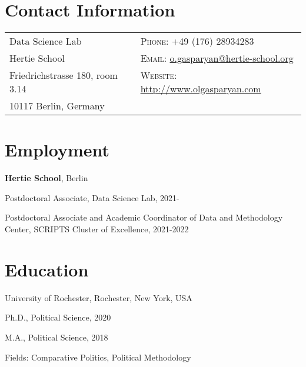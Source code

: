 \documentclass[margin,line,10.95pt]{res}
\newenvironment{list1}{
  \begin{list}{\ding{113}}{%
      \setlength{\itemsep}{0in}
      \setlength{\parsep}{0in} \setlength{\parskip}{0in}
      \setlength{\topsep}{0in} \setlength{\partopsep}{0in}
      \setlength{\leftmargin}{0.17in}}}{\end{list}}
\begin{document}

\begin{resume}
\section{\sc Contact Information}
\vspace{.05in}
\begin{tabular}{@{}p{2.5in}p{4in}}
Data Science Lab                 & \textsc{Phone}: +49 (176) 28934283 \\
  Hertie School  & \textsc{Email}: \href{mailto:o.gasparyan@hertie-school.org}{o.gasparyan@hertie-school.org} \\
Friedrichstrasse 180, room 3.14              & \textsc{Website}: \href{http://www.olgasparyan.com}{http://www.olgasparyan.com} \\
10117 Berlin, Germany        \\
\end{tabular}

\section{\sc Employment}



{\textbf{Hertie School}}, Berlin\\
\vspace*{-.1in}
\begin{list1}
	\item[] Postdoctoral Associate, Data Science Lab, 2021-
	\item[] Postdoctoral Associate and Academic Coordinator of Data and Methodology Center, SCRIPTS Cluster of Excellence, 2021-2022

\end{list1}

\section{\sc Education}
{University of Rochester}, Rochester, New York, USA\\
\vspace*{-.1in}
\begin{list1}
\item[] Ph.D., Political Science, 2020 
\item[] M.A., Political Science, 2018 
\item[] Fields: Comparative Politics, Political Methodology 
\end{list1}


\end{resume}
\end{document}
